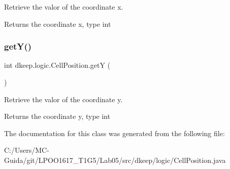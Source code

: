 Retrieve the valor of the coordinate x. \begin{DoxyReturn}{Returns}
the coordinate x, type int 
\end{DoxyReturn}
\mbox{\label{classdkeep_1_1logic_1_1_cell_position_aaf1787de163be74c6c284562911e5ca5}} 
\subsubsection{\texorpdfstring{get\+Y()}{getY()}}
{\footnotesize\ttfamily int dkeep.\+logic.\+Cell\+Position.\+getY (\begin{DoxyParamCaption}{ }\end{DoxyParamCaption})}

Retrieve the valor of the coordinate y. \begin{DoxyReturn}{Returns}
the coordinate y, type int 
\end{DoxyReturn}


The documentation for this class was generated from the following file\+:\begin{DoxyCompactItemize}
\item 
C\+:/\+Users/\+M\+C-\/\+Guida/git/\+L\+P\+O\+O1617\+\_\+\+T1\+G5/\+Lab05/src/dkeep/logic/Cell\+Position.\+java\end{DoxyCompactItemize}
